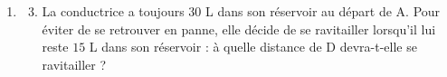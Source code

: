 \documentclass[11pt]{article}
\begin{document}
\begin{enumerate}[leftmargin=*]
  \item[] \begin{enumerate}
        \setcounter{enumii}{2}
      \item La conductrice a toujours $30$ L dans son réservoir au départ de A.
        Pour éviter de se retrouver en panne, elle décide de se
        ravitailler lorsqu'il lui reste $15$ L dans son réservoir : à quelle
        distance de D devra-t-elle se ravitailler ?
    \end{enumerate}
\end{enumerate}
\end{document}
